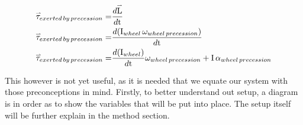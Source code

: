 \documentclass{article}
\newcommand{\myvect}[1]{\accentset{\rightharpoonup}{#1}}
\begin{document}
\begin{equation*}
\begin{aligned}
    \myvect{\tau}_{exerted\,by\,precession} =& \frac{d\myvect{\text{L}}}{d\text{t}}\\
    \myvect{\tau}_{exerted\,by\,precession} =& \frac{d(\text{I}_{wheel}\,\omega _{wheel\,precession})}{d\text{t}}\\
    \myvect{\tau}_{exerted\,by\,precession} =& \frac{d(\text{I}_{wheel})}{d\text{t}}\omega_{wheel\,precession} + \text{I}\,\alpha_{wheel\,precession}\\
\end{aligned}
\end{equation*}

This however is not yet useful, as it is needed that we equate our system with those preconceptions in mind. Firstly, to better understand out setup, a diagram is in order as to show the variables that will be put into place. The setup itself will be further explain in the method section.
\end{document}
